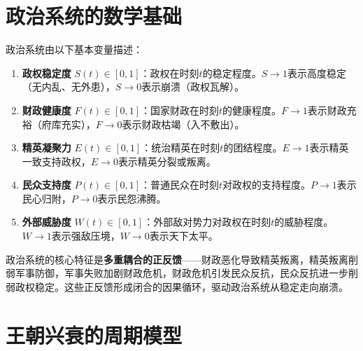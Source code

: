\section{政治系统的数学基础}

\begin{definition}[政治系统的基本量]\label{def:political_quantities}
政治系统由以下基本变量描述：
\begin{enumerate}[label=(\roman*)]
    \item \textbf{政权稳定度} $S(t) \in [0,1]$：政权在时刻$t$的稳定程度。$S \to 1$表示高度稳定（无内乱、无外患），$S \to 0$表示崩溃（政权瓦解）。
    \item \textbf{财政健康度} $F(t) \in [0,1]$：国家财政在时刻$t$的健康程度。$F \to 1$表示财政充裕（府库充实），$F \to 0$表示财政枯竭（入不敷出）。
    \item \textbf{精英凝聚力} $E(t) \in [0,1]$：统治精英在时刻$t$的团结程度。$E \to 1$表示精英一致支持政权，$E \to 0$表示精英分裂或叛离。
    \item \textbf{民众支持度} $P(t) \in [0,1]$：普通民众在时刻$t$对政权的支持程度。$P \to 1$表示民心归附，$P \to 0$表示民怨沸腾。
    \item \textbf{外部威胁度} $W(t) \in [0,1]$：外部敌对势力对政权在时刻$t$的威胁程度。$W \to 1$表示强敌压境，$W \to 0$表示天下太平。
\end{enumerate}
政治系统的核心特征是\textbf{多重耦合的正反馈}——财政恶化导致精英叛离，精英叛离削弱军事防御，军事失败加剧财政危机，财政危机引发民众反抗，民众反抗进一步削弱政权稳定。这些正反馈形成闭合的因果循环，驱动政治系统从稳定走向崩溃。
\end{definition}

\section{王朝兴衰的周期模型}

